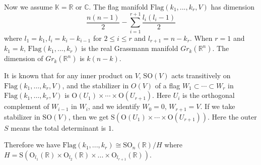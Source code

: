 \documentclass[a4paper]{amsart}
\newcommand{\RO}{{\mathrm {O}}} \newcommand{\RP}{{\mathrm {P}}}
\newcommand{\RS}{{\mathrm {S}}} \newcommand{\RT}{{\mathrm {T}}}
\newcommand{\RU}{{\mathrm {U}}} \newcommand{\RV}{{\mathrm {V}}}
\newcommand{\Flag}{\mathrm{Flag}}
\newcommand{\SO}{{\mathrm{SO}}}\newcommand{\so}{\mathfrak{so}}
\theoremstyle{plain}
\newtheorem{thm}{Theorem}[section] \newtheorem{cor}[thm]{Corollary}
\theoremstyle{remark} \newtheorem{remark}[thm]{Remark}
\theoremstyle{remark} \newtheorem{exercise}{Exercise}
\theoremstyle{remark} \newtheorem{example}{Example}
\numberwithin{equation}{section}
\begin{document}


Now we assume $\mathbb{K}=\mathbb{R}$ or $\mathbb{C}$. The flag manifold $\Flag(k_1,...,k_r, V)$ %
has dimension $$\frac{n(n-1)}2-\sum_{i=1}^{r+1}\frac{l_i(l_i-1)}2$$ 
where $l_1=k_1, l_i=k_i-k_{i-1}$ for $2\le i \le r$ and $l_{r+1}=n-k_r$.
When $r=1$ and $k_1=k$, $\Flag(k_1,..., k_r)$ is the real Grassmann manifold $Gr_k(\mathbb{R}^n)$. The dimension of $Gr_k(\mathbb{R}^n)$ is $k(n-k)$.

It is known that for any inner product on $V$, $\SO(V)$ acts transitively on $\Flag(k_1,\ldots,k_r,V)$, and the stabilizer in $O(V)$ of a flag $W_1\subset\cdots\subset W_r$ in $\Flag(k_1,\ldots,k_r,V)$ is $\RO(U_1)\times\cdots\times\RO(U_{r+1})$. Here $U_i$ is the orthogonal complement of $W_{i-1}$ in $W_i$, and we identify $W_0=0$, $W_{r+1}=V$. If we take stabilizer in $\SO(V)$, then we get $\RS(\RO(U_1)\times\cdots\times\RO(U_{r+1}))$. Here the outer $S$ means the total determinant is $1$. 

Therefore we have $\text{Flag}(k_1,...,k_r)\cong \text{SO}_n(\mathbb{R})/H$ where $H=\text{S}(\text{O}_{l_1}(\mathbb{R})\times \text{O}_{l_2}(\mathbb{R})\times...\times \text{O}_{l_{r+1}}(\mathbb{R}))$.
\end{document}
